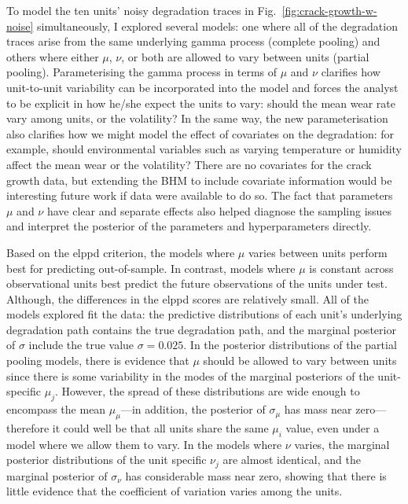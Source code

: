 To model the ten units' noisy degradation traces in Fig.~\ref{fig:crack-growth-w-noise} simultaneously, I explored several models: one where all of the degradation traces arise from the same underlying gamma process (complete pooling) and others where either $\mu$, $\nu$, or both are allowed to vary between units (partial pooling). Parameterising the gamma process in terms of $\mu$ and $\nu$ clarifies how unit-to-unit variability can be incorporated into the model and forces the analyst to be explicit in how he/she expect the units to vary: should the mean wear rate vary among units, or the volatility? In the same way, the new parameterisation also clarifies how we might model the effect of covariates on the degradation: for example, should environmental variables such as varying temperature or humidity affect the mean wear or the volatility? There are no covariates for the crack growth data, but extending the BHM to include covariate information would be interesting future work if data were available to do so. The fact that parameters $\mu$ and $\nu$ have clear and separate effects also helped diagnose the sampling issues and interpret the posterior of the parameters and hyperparameters directly.

Based on the elppd criterion, the models where $\mu$ varies between units perform best for predicting out-of-sample. In contrast, models where $\mu$ is constant across observational units best predict the future observations of the units under test. Although, the differences in the elppd scores are relatively small. All of the models explored fit the data: the predictive distributions of each unit's underlying degradation path contains the true degradation path, and the marginal posterior of $\sigma$ include the true value $\sigma = 0.025$. In the posterior distributions of the partial pooling models, there is evidence that $\mu$ should be allowed to vary between units since there is some variability in the modes of the marginal posteriors of the unit-specific $\mu_j$. However, the spread of these distributions are wide enough to encompass the mean $\mu_\mu$---in addition, the posterior of $\sigma_\mu$ has mass near zero---therefore it could well be that all units share the same $\mu_i$ value, even under a model where we allow them to vary. In the models where $\nu$ varies, the marginal posterior distributions of the unit specific $\nu_j$ are almost identical, and the marginal posterior of $\sigma_\nu$ has considerable mass near zero, showing that there is little evidence that the coefficient of variation varies among the units.

